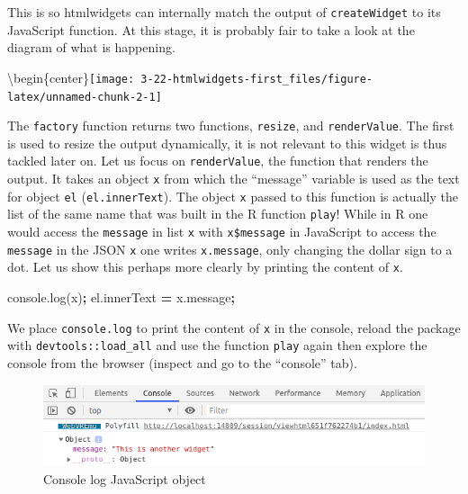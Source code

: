 \documentclass[
]{krantz}
\makeatletter
\newenvironment{Shaded}{\begin{snugshade}}{\end{snugshade}}
\newcommand{\AttributeTok}[1]{\textcolor[rgb]{0.61,0.61,0.61}{#1}}
\newcommand{\NormalTok}[1]{#1}
\newcommand{\OperatorTok}[1]{\textcolor[rgb]{0.43,0.43,0.43}{\textbf{#1}}}
\newcommand{\VariableTok}[1]{\textcolor[rgb]{0,0,0}{#1}}
\newenvironment{kframe}{%
\medskip{}
\setlength{\fboxsep}{.8em}
 \def\at@end@of@kframe{}%
 \ifinner\ifhmode%
  \def\at@end@of@kframe{\end{minipage}}%
  \begin{minipage}{\columnwidth}%
 \fi\fi%
 \def\FrameCommand##1{\hskip\@totalleftmargin \hskip-\fboxsep
 \colorbox{shadecolor}{##1}\hskip-\fboxsep
     \hskip-\linewidth \hskip-\@totalleftmargin \hskip\columnwidth}%
 \MakeFramed {\advance\hsize-\width
   \@totalleftmargin\z@ \linewidth\hsize
   \@setminipage}}%
 {\par\unskip\endMakeFramed%
 \at@end@of@kframe}
\renewenvironment{Shaded}{\begin{kframe}}{\end{kframe}}
\makeatother
\begin{document}
This is so htmlwidgets can internally match the output of \texttt{createWidget} to its JavaScript function. At this stage, it is probably fair to take a look at the diagram of what is happening.

\textbackslash begin\{center\}\texttt{[image: 3-22-htmlwidgets-first\_files/figure-latex/unnamed-chunk-2-1]}

The \texttt{factory} function returns two functions, \texttt{resize}, and \texttt{renderValue}. The first is used to resize the output dynamically, it is not relevant to this widget is thus tackled later on. Let us focus on \texttt{renderValue}, the function that renders the output. It takes an object \texttt{x} from which the ``message'' variable is used as the text for object \texttt{el} (\texttt{el.innerText}). The object \texttt{x} passed to this function is actually the list of the same name that was built in the R function \texttt{play}! While in R one would access the \texttt{message} in list \texttt{x} with \texttt{x\$message} in JavaScript to access the \texttt{message} in the JSON \texttt{x} one writes \texttt{x.message}, only changing the dollar sign to a dot. Let us show this perhaps more clearly by printing the content of \texttt{x}.

\begin{Shaded}
\begin{Highlighting}[]
\VariableTok{console}\NormalTok{.}\AttributeTok{log}\NormalTok{(x)}\OperatorTok{;}
\VariableTok{el}\NormalTok{.}\AttributeTok{innerText} \OperatorTok{=} \VariableTok{x}\NormalTok{.}\AttributeTok{message}\OperatorTok{;}
\end{Highlighting}
\end{Shaded}

We place \texttt{console.log} to print the content of \texttt{x} in the console, reload the package with \texttt{devtools::load\_all} and use the function \texttt{play} again then explore the console from the browser (inspect and go to the ``console'' tab).

\begin{figure}[t]

{\centering \includegraphics[width=1\linewidth]{images/playground-console-x} 

}

\caption{Console log JavaScript object}\label{fig:playground-console}
\end{figure}
\end{document}
